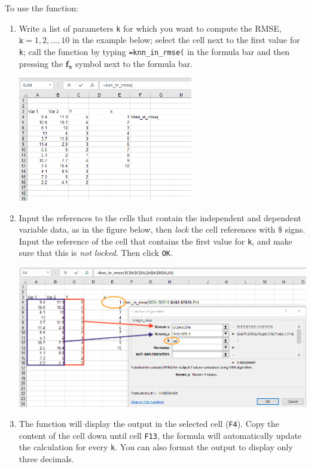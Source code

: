 \documentclass[12pt]{article}
\begin{document}
To use the function:
\begin{enumerate}
\item Write a list of parameters \texttt{k} for which you want to compute the RMSE, $\texttt{k}=1,2,...,10$ in the example below; select the cell next to the first value for \texttt{k}; call the function by typing \texttt{=knn\_in\_rmse(} in the formula bar and then pressing the $\boldsymbol{f_x}$ symbol next to the formula bar.

\medskip

\centerline{\includegraphics[width=3in]{figures/knnrmse1}}

\medskip

\item Input the references to the cells that contain the independent and dependent variable data, as in the figure below, then \textit{lock} the cell references with $\$$ signs. Input the reference of the cell that contains the first value for \texttt{k}, and make sure that this is \textit{not locked}. Then click \texttt{OK}.

\medskip

\centerline{\includegraphics[width=5.5in]{figures/knnrmse2}}

\medskip

\item The function will display the output in the selected cell (\texttt{F4}). Copy the content of the cell down until cell \texttt{F13}, the formula will automatically update the calculation for every \texttt{k}. You can also format the output to display only three decimals.
\medskip


\end{enumerate}
\end{document}

